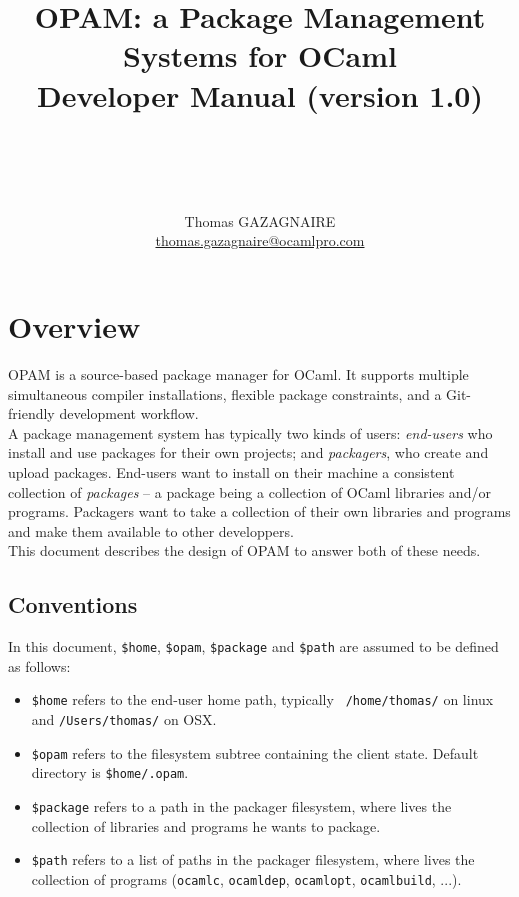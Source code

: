 \documentclass[a4paper,11pt]{article}
\title{
OPAM: a Package Management Systems for OCaml\\
Developer Manual (version 1.0)\\ ~\ \\
~\ \\}
\author{Thomas GAZAGNAIRE\\
\url{thomas.gazagnaire@ocamlpro.com}\\
}
\begin{document}
\maketitle

\vfill

\tableofcontents

\section*{Overview}

OPAM is a source-based package manager for OCaml. It supports multiple simultaneous
compiler installations, flexible package constraints, and a Git-friendly development
workflow.\\

A package management system has typically two kinds of users: {\em
  end-users} who install and use packages for their own projects; and
{\em packagers}, who create and upload packages. End-users want to
install on their machine a consistent collection of {\em packages} --
a package being a collection of OCaml libraries and/or programs.
Packagers want to take a collection of their own libraries and
programs and make them available to other developpers.\\

This document describes the design of OPAM to answer both of these needs.

\subsection*{Conventions}

In this document, \verb+$home+, \verb+$opam+, \verb+$package+ and
\verb+$path+ are assumed to be defined as follows:

\begin{itemize}

\item {\tt \$home} refers to the end-user home path, typically {\tt
  /home/thomas/} on linux and {\tt /Users/thomas/} on OSX.

\item {\tt \$opam} refers to the filesystem subtree containing the
  client state. Default directory is {\tt \$home/.opam}.

\item {\tt \$package} refers to a path in the packager filesystem, where
  lives the collection of libraries and programs he wants to package.

\item {\tt \$path} refers to a list of paths in the packager filesystem, where
  lives the collection of programs ({\tt ocamlc}, {\tt ocamldep}, {\tt ocamlopt},
  {\tt ocamlbuild}, ...).

\end{itemize}
\end{document}
